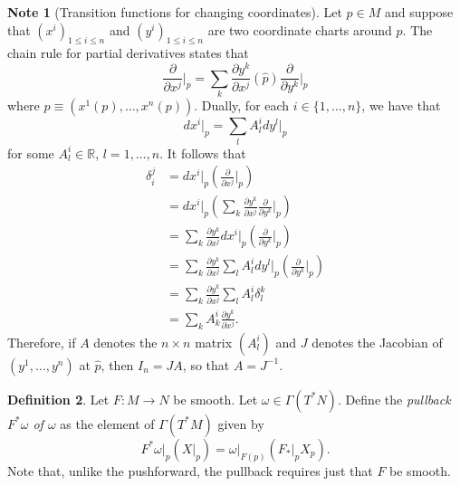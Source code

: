 \documentclass[10pt,letterpaper,cm]{nupset}
\theoremstyle{definition}
\newtheorem{definition}{Definition}[subsection]
\newtheorem{note}[definition]{Note}
\theoremstyle{theorem}
\theoremstyle{remark}
\newcommand{\R}{\mathbb R}
\newcommand{\1}{\mathbf{1}}
\newcommand{\0}{\vec 0}
\begin{document}
\begin{note}[Transition functions for changing coordinates]
Let $p\in M$ and suppose that $\left(x^i\right)_{1\leq i \leq n}$ and $\left(y^i\right)_{1\leq i \leq n}$ are two coordinate charts around $p$. The chain rule for partial derivatives states that
\[
 \frac{\partial}{\partial{x^j}}\bigr\rvert_p =   \sum_k\frac{\partial y^{k}}{\partial x^{j}}(\hat{p}) \frac{\partial}{\partial y^{k}}\bigr\rvert_p
\] where $\hat{p} \equiv \left(x^1(p), \ldots, x^n(p)\right)$.  Dually, for each $i \in \{1, \ldots, n\}$, we have that
\[
d{x^i}\bigr\rvert_p = \sum_l A_l^id{y^l}\bigr\rvert_p
\] for some $A^i_l \in \R$, $l =1, \ldots, n$. It follows  that
\begin{align*}
 \delta_i^j 
 &=d x^{i}\bigr\rvert_{p}\left(\frac{\partial}{\partial x^{j}}\bigr\rvert_{p}\right) 
 \\ &=d x^{i}\bigr\rvert_{p}\left(\sum_{k} \frac{\partial y^{k}}{\partial x^{j}} \frac{\partial}{\partial y^{k}}\bigr\rvert_{p}\right) 
 \\ &=\sum_{k} \frac{\partial y^{k}}{\partial x^{j}} d x^{i}\bigr\rvert_{p}\left(\frac{\partial}{\partial y^{k}}\bigr\rvert_{ p }\right)
\\ & = 
\sum_{k} \frac{\partial y^{k}}{\partial x^{j}} \sum_{l} A_{l}^{i} d y^{l}\bigr\rvert_{p}\left(\frac{\partial}{\partial y^{k}}\bigr\rvert_{ p }\right)
\\ & = \sum_{k} \frac{\partial y^{k}}{\partial x^{j}} \sum_{l} A_{l}^{i} \delta_{l}^k
\\ &  =\sum_{k} A_{k}^{i}\frac{\partial y^{k}}{\partial x^{j}}
. \end{align*} 
Therefore, if $A$ denotes the $n\times n$ matrix $\left(A_l^i\right)$ and $J$ denotes the Jacobian of $\left(y^1, \ldots, y^n\right)$ at $\hat{p}$, then $I_n = JA$, so that $A = J^{-1}$.
\end{note}

\begin{definition}
Let $F: M \to N$ be smooth. Let $\omega \in \Gamma(T^{\ast}N)$. Define the \textit{pullback $F^{\ast}\omega$ of $\omega$}  as the  element of $\Gamma(T^{\ast}M)$ given by $$F^{\ast}\omega \bigr\rvert_p \left(X \bigr\rvert_p\right) = \omega \bigr\rvert_{F(p)}\left(F_{\ast}\bigr\rvert_p X_p\right).$$ Note that, unlike the pushforward, the pullback requires just that $F$ be smooth. 
\end{definition}
\end{document}
